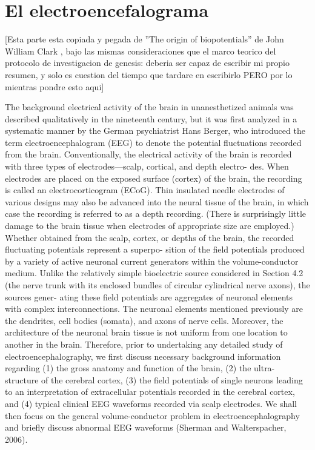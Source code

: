 \section{El electroencefalograma}

[Esta parte esta copiada y pegada de ''The origin of biopotentials'' de John William Clark \cite{clark98},
bajo las mismas consideraciones que el marco teorico del protocolo de investigacion de genesis:
deberia ser capaz de escribir mi propio resumen, y solo es cuestion del tiempo que tardare en escribirlo
PERO por lo mientras pondre esto aqui]

The background electrical activity of the brain in unanesthetized animals was
described qualitatively in the nineteenth century, but it was first analyzed in a
systematic manner by the German psychiatrist Hans Berger, who introduced
the term electroencephalogram (EEG) to denote the potential fluctuations
recorded from the brain. Conventionally, the electrical activity of the brain is
recorded with three types of electrodes—scalp, cortical, and depth electro-
des. When electrodes are placed on the exposed surface (cortex) of the brain,
the recording is called an electrocorticogram (ECoG). Thin insulated needle
electrodes of various designs may also be advanced into the neural tissue of
the brain, in which case the recording is referred to as a depth recording.
(There is surprisingly little damage to the brain tissue when electrodes of
appropriate size are employed.) Whether obtained from the scalp, cortex, or
depths of the brain, the recorded fluctuating potentials represent a superpo-
sition of the field potentials produced by a variety of active neuronal current
generators within the volume-conductor medium. Unlike the relatively
simple bioelectric source considered in Section 4.2 (the nerve trunk with
its enclosed bundles of circular cylindrical nerve axons), the sources gener-
ating these field potentials are aggregates of neuronal elements with complex
interconnections. The neuronal elements mentioned previously are the
dendrites, cell bodies (somata), and axons of nerve cells. Moreover, the
architecture of the neuronal brain tissue is not uniform from one location to
another in the brain. Therefore, prior to undertaking any detailed study of
electroencephalography, we first discuss necessary background information
regarding (1) the gross anatomy and function of the brain, (2) the ultra-
structure of the cerebral cortex, (3) the field potentials of single neurons
leading to an interpretation of extracellular potentials recorded in the
cerebral cortex, and (4) typical clinical EEG waveforms recorded via scalp
electrodes. We shall then focus on the general volume-conductor problem in
electroencephalography and briefly discuss abnormal EEG waveforms
(Sherman and Walterspacher, 2006).

